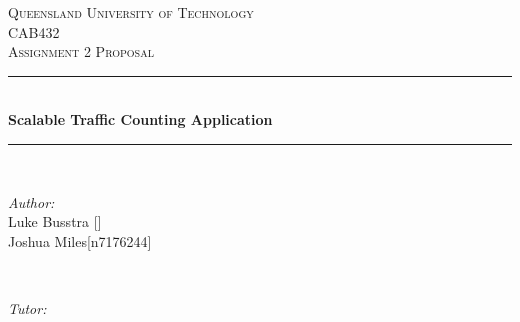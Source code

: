 \documentclass[12pt]{article}
\begin{document}
\begin{titlepage}

\newcommand{\HRule}{\rule{\linewidth}{0.5mm}} %

\center %


\textsc{\LARGE Queensland University of Technology}\\[1.5cm] %
\textsc{\Large CAB432}\\[0.5cm] %
\textsc{\large Assignment 2 Proposal}\\[0.5cm] %


\HRule \\[0.4cm]
{ \huge \bfseries Scalable Traffic Counting Application }\\[0.4cm] %
\HRule \\[1.5cm]


\begin{minipage}{0.4\textwidth}
\begin{flushleft} \large
	\emph{Author:}\\
	Luke Busstra [] \\
	Joshua Miles[n7176244] %
\end{flushleft}
\end{minipage}
~
\begin{minipage}{0.4\textwidth}
\begin{flushright} \large
\emph{Tutor:} \\
 \textsc{} %
\end{flushright}
\end{minipage}\\[0.5cm]



\end{titlepage}
\end{document}
